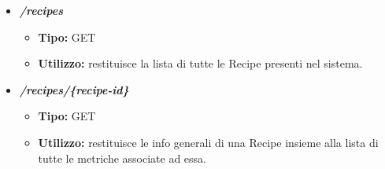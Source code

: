 \begin{itemize}

  \item \textit{\textbf{/recipes}}
  \begin{itemize}
    \item \textbf{Tipo:} GET
    \item \textbf{Utilizzo:} restituisce la lista di tutte le Recipe presenti nel sistema.
  \end{itemize}
  \item \textit{\textbf{/recipes/\{recipe-id\}}}
  \begin{itemize}
    \item \textbf{Tipo:} GET
    \item \textbf{Utilizzo:} restituisce le info generali di una Recipe insieme alla lista di tutte le metriche associate ad essa.
  \end{itemize}


\end{itemize}

